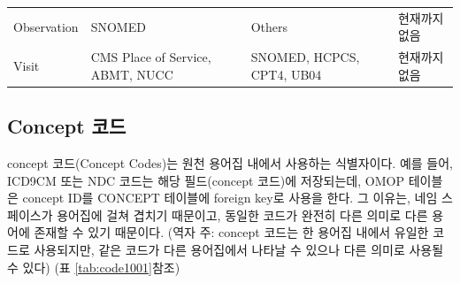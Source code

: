\documentclass[11pt]{book}
\theoremstyle{definition}
\theoremstyle{definition}
\theoremstyle{definition}
\theoremstyle{remark}
\begin{document}
\begin{longtable}[]{@{}llll@{}}
\begin{minipage}[t]{0.12\columnwidth}\raggedright\strut
Observation\strut
\end{minipage} & \begin{minipage}[t]{0.21\columnwidth}\raggedright\strut
SNOMED\strut
\end{minipage} & \begin{minipage}[t]{0.21\columnwidth}\raggedright\strut
Others\strut
\end{minipage} & \begin{minipage}[t]{0.18\columnwidth}\raggedright\strut
현재까지 없음\strut
\end{minipage}\tabularnewline
\begin{minipage}[t]{0.12\columnwidth}\raggedright\strut
Visit\strut
\end{minipage} & \begin{minipage}[t]{0.21\columnwidth}\raggedright\strut
CMS Place of Service, ABMT, NUCC\strut
\end{minipage} & \begin{minipage}[t]{0.21\columnwidth}\raggedright\strut
SNOMED, HCPCS, CPT4, UB04\strut
\end{minipage} & \begin{minipage}[t]{0.18\columnwidth}\raggedright\strut
현재까지 없음\strut
\end{minipage}\tabularnewline
\bottomrule
\end{longtable}

\subsection{Concept 코드}\label{concept-}

concept 코드(Concept Codes)는 원천 용어집 내에서 사용하는 식별자이다.
예를 들어, ICD9CM 또는 NDC 코드는 해당 필드(concept 코드)에 저장되는데,
OMOP 테이블은 concept ID를 CONCEPT 테이블에 foreign key로 사용을 한다.
그 이유는, 네임 스페이스가 용어집에 걸쳐 겹치기 때문이고, 동일한 코드가
완전히 다른 의미로 다른 용어에 존재할 수 있기 때문이다. (역자 주:
concept 코드는 한 용어집 내에서 유일한 코드로 사용되지만, 같은 코드가
다른 용어집에서 나타날 수 있으나 다른 의미로 사용될 수 있다) (표
\ref{tab:code1001}참조) 
\end{document}

